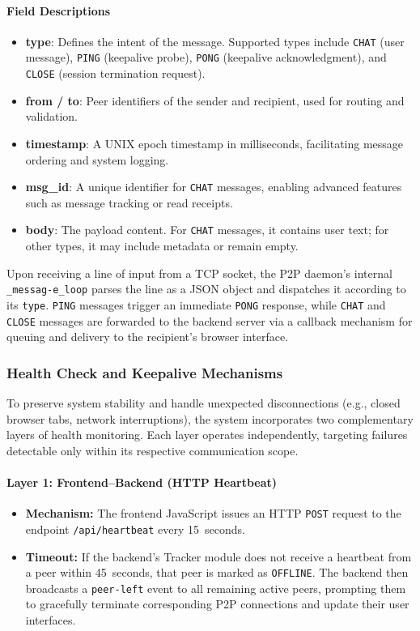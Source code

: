 \paragraph{Field Descriptions}
\begin{itemize}
    \item \textbf{type}: Defines the intent of the message. Supported types include \texttt{CHAT} (user message), \texttt{PING} (keepalive probe), \texttt{PONG} (keepalive acknowledgment), and \texttt{CLOSE} (session termination request).
    \item \textbf{from / to}: Peer identifiers of the sender and recipient, used for routing and validation.
    \item \textbf{timestamp}: A UNIX epoch timestamp in milliseconds, facilitating message ordering and system logging.
    \item \textbf{msg\_id}: A unique identifier for \texttt{CHAT} messages, enabling advanced features such as message tracking or read receipts.
    \item \textbf{body}: The payload content. For \texttt{CHAT} messages, it contains user text; for other types, it may include metadata or remain empty.
\end{itemize}

Upon receiving a line of input from a TCP socket, the P2P daemon’s internal \texttt{\_messag-\break e\_loop} parses the line as a JSON object and dispatches it according to its \texttt{type}. 
\texttt{PING} messages trigger an immediate \texttt{PONG} response, while \texttt{CHAT} and \texttt{CLOSE} messages are forwarded to the backend server via a callback mechanism for queuing and delivery to the recipient’s browser interface.

\subsubsection{Health Check and Keepalive Mechanisms}
To preserve system stability and handle unexpected disconnections (e.g., closed browser tabs, network interruptions), the system incorporates two complementary layers of health monitoring. 
Each layer operates independently, targeting failures detectable only within its respective communication scope.

\paragraph{Layer 1: Frontend--Backend (HTTP Heartbeat)}
\begin{itemize}
    \item \textbf{Mechanism:} The frontend JavaScript issues an HTTP \texttt{POST} request to the endpoint \texttt{/api/heartbeat} every 15~seconds.
    \item \textbf{Timeout:} If the backend’s Tracker module does not receive a heartbeat from a peer within 45~seconds, that peer is marked as \texttt{OFFLINE}. 
    The backend then broadcasts a \texttt{peer-left} event to all remaining active peers, prompting them to gracefully terminate corresponding P2P connections and update their user interfaces.
\end{itemize}

